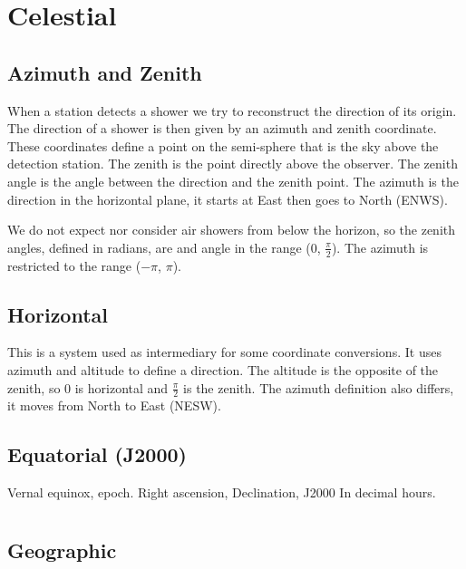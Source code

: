 \section{Celestial}

\subsection{Azimuth and Zenith}

When a station detects a shower we try to reconstruct the direction of
its origin. The direction of a shower is then given by an azimuth and
zenith coordinate. These coordinates define a point on the semi-sphere
that is the sky above the detection station. The zenith is the point
directly above the observer. The zenith angle is the angle between the
direction and the zenith point. The azimuth is the direction in the
horizontal plane, it starts at East then goes to North (ENWS).

We do not expect nor consider air showers from below the horizon, so the
zenith angles, defined in radians, are and angle in the range (0,
$\frac{\pi}{2}$). The azimuth is restricted to the range ($-\pi$, $\pi$).


\subsection{Horizontal}

This is a system used as intermediary for some coordinate conversions.
It uses azimuth and altitude to define a direction. The altitude is the
opposite of the zenith, so 0 is horizontal and $\frac{\pi}{2}$ is the
zenith. The azimuth definition also differs, it moves from North to East
(NESW).


\subsection{Equatorial (J2000)}

Vernal equinox, epoch.
Right ascension, Declination, J2000
In decimal hours.


\section{\corsika}

\cite{corsika}

\subsection{Geographic}

